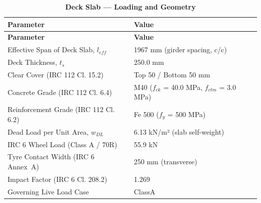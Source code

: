 \documentclass[12pt,a4paper]{report}
\numberwithin{table}{chapter}
\numberwithin{figure}{chapter}
\begin{document}
\vspace{1em}
\begin{longtable}{|L{5.5cm}|p{10.0cm}|}
\caption{\textbf{Deck Slab --- Loading and Geometry}}\\
\hline
\textbf{Parameter} & \textbf{Value} \\[6pt]
\hline
\endfirsthead

\hline
\textbf{Parameter} & \textbf{Value} \\[6pt]
\hline
\endhead
\hline
\endlastfoot
\textnormal{Effective Span of Deck Slab, $l_{eff}$} & 1967 mm (girder spacing, c/c) \\[6pt]
\hline
\textnormal{Deck Thickness, $t_s$} & 250.0 mm \\[6pt]
\hline
\textnormal{Clear Cover (IRC 112 Cl. 15.2)} & Top 50 / Bottom 50 mm \\[6pt]
\hline
\textnormal{Concrete Grade (IRC 112 Cl. 6.4)} & M40 ($f_{ck}$ = 40.0 MPa, $f_{ctm}$ = 3.0 MPa) \\[6pt]
\hline
\textnormal{Reinforcement Grade (IRC 112 Cl. 6.2)} & Fe 500 ($f_y$ = 500 MPa) \\[6pt]
\hline
\textnormal{Dead Load per Unit Area, $w_{DL}$} & 6.13 kN/m² (slab self-weight) \\[6pt]
\hline
\textnormal{IRC 6 Wheel Load (Class A / 70R)} & 55.9 kN \\[6pt]
\hline
\textnormal{Tyre Contact Width (IRC 6 Annex~A)} & 250 mm (transverse) \\[6pt]
\hline
\textnormal{Impact Factor (IRC 6 Cl. 208.2)} & 1.269 \\[6pt]
\hline
\textnormal{Governing Live Load Case} & ClassA \\[6pt]
\end{longtable}
\end{document}
